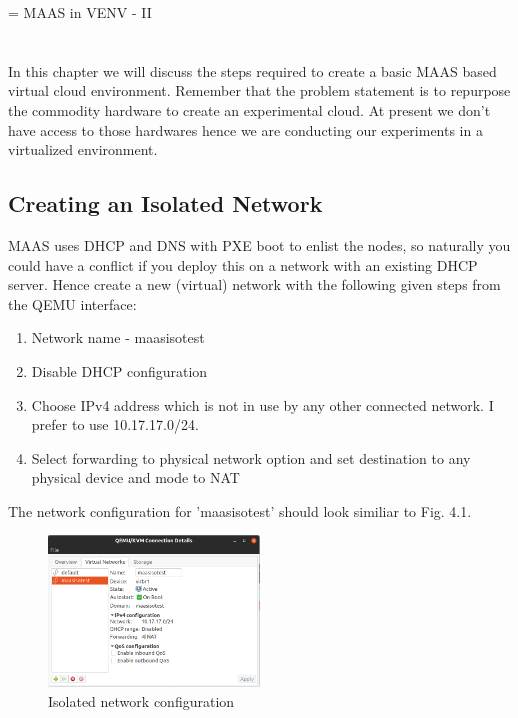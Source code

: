 \chapname = {MAAS in VENV - II}

\chapter{\the\chapname}

In this chapter we will discuss the steps required to create a basic MAAS based virtual cloud environment. Remember that the problem statement is to repurpose the commodity hardware to create an experimental cloud. At present we don't have access to those hardwares hence we are conducting our experiments in a virtualized environment. 

\section{Creating an Isolated Network}

MAAS uses DHCP and DNS with PXE boot to enlist the nodes, so naturally you could have a conflict if you deploy this on a network with an existing DHCP server. Hence create a new (virtual) network with the following given steps from the QEMU interface:

\begin{enumerate}
    \setlength\itemsep{0em}
    \item Network name - maasisotest
    \item Disable DHCP configuration
    \item Choose IPv4 address which is not in use by any other connected network. I prefer to use 10.17.17.0/24.
    \item Select forwarding to physical network option and set destination to any physical device and mode to NAT
\end{enumerate}

The network configuration for 'maasisotest' should look similiar to Fig. 4.1. 

\begin{figure}[!ht]
    \centering
    \includegraphics[width=0.5\textwidth]{images/4-1.png}
    \caption{Isolated network configuration}
\end{figure}


